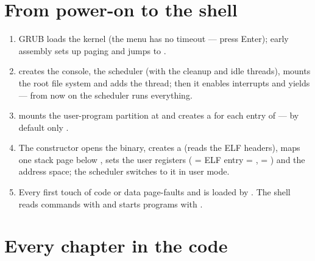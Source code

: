 \section{From power-on to the shell}

\begin{enumerate}
  \item GRUB loads the kernel (the menu has no timeout --- press Enter);
    early assembly sets up paging and jumps to .
  \item {} creates the console, the scheduler (with the
    cleanup and idle threads), mounts the root file system and adds the
     thread; then it enables interrupts and yields ---
    from now on the scheduler runs everything.
  \item {} mounts the user-program partition at
     and creates a  for each entry of
     --- by default only .
  \item The  constructor opens the binary, creates a
     (reads the ELF headers), maps one stack page below
    , sets the user registers ( = ELF entry =
    ,  = ) and the address
    space; the scheduler switches to it in user mode.
  \item Every first touch of code or data page-faults and is loaded by
    . The shell reads commands with 
    and starts programs with .
\end{enumerate}

\section{Every chapter in the code}

